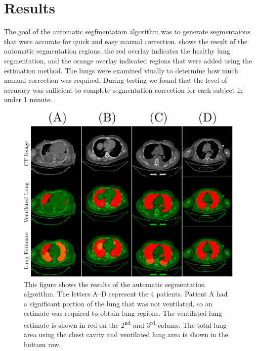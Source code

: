 \section{Results}

The goal of the automatic segfmentation algorithm was to 
generate segmentaions that were accurate for quick 
and easy manual correction. 
shows the result of the automatic segmentation regions.
the red overlay indicates the healthy lung segmentation,
and the orange overlay indicated regions that were added
using the estimation method. 
The lungs were examined viually to determine 
how much manual correction was required. During testing
we found that the level of accuracy was sufficient to 
complete segmentation correction for each subject in 
under 1 minute.

\begin{figure}
	\centering
	\includegraphics[width=\textwidth]{chapter5-CT_to_mesh/imgs/lung_segmentation_results.pdf}
	\caption[Lung segmentation results]{\label{fig:lung-seg-results}%
	This figure shows the results of the automatic segmentation algorithm. The letters A--D 
	represent the 4 patients. Patient A had a significant portion of the lung that was not
	ventilated, so an estimate was required to obtain lung regions. The ventilated lung estimate
	is shown in red on the 2\textsuperscript{nd} and 3\textsuperscript{rd} colums.
	The total lung area using the chest cavity and ventilated lung area is shown in the
	bottom row.}
\end{figure}

